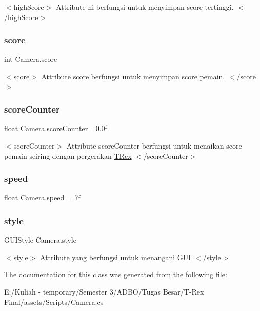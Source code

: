$<$high\+Score$>$ Attribute hi berfungsi untuk menyimpan score tertinggi. $<$/high\+Score$>$ \hypertarget{class_camera_abf86e03ac82c531858df39468f8e190b}{}\label{class_camera_abf86e03ac82c531858df39468f8e190b} 
\subsubsection{\texorpdfstring{score}{score}}
{\footnotesize\ttfamily int Camera.\+score}

$<$score$>$ Attribute score berfungsi untuk menyimpan score pemain. $<$/score$>$ \hypertarget{class_camera_a8b771a0c2cb6e4fd4b3213a87e0f1a88}{}\label{class_camera_a8b771a0c2cb6e4fd4b3213a87e0f1a88} 
\subsubsection{\texorpdfstring{score\+Counter}{scoreCounter}}
{\footnotesize\ttfamily float Camera.\+score\+Counter =0.\+0f}

$<$score\+Counter$>$ Attribute score\+Counter berfungsi untuk menaikan score pemain seiring dengan pergerakan \hyperlink{class_t_rex}{T\+Rex} $<$/score\+Counter$>$ \hypertarget{class_camera_a9afbcb25512024bd94c4abc84c85d651}{}\label{class_camera_a9afbcb25512024bd94c4abc84c85d651} 
\subsubsection{\texorpdfstring{speed}{speed}}
{\footnotesize\ttfamily float Camera.\+speed = 7f}





\hypertarget{class_camera_afaadb7e35bf0918a0abcb53e73a2c565}{}\label{class_camera_afaadb7e35bf0918a0abcb53e73a2c565} 
\subsubsection{\texorpdfstring{style}{style}}
{\footnotesize\ttfamily G\+U\+I\+Style Camera.\+style}

$<$style$>$ Attribute yang berfungsi untuk menangani G\+UI $<$/style$>$ 

The documentation for this class was generated from the following file\+:\begin{DoxyCompactItemize}
\item 
E\+:/\+Kuliah -\/ temporary/\+Semester 3/\+A\+D\+B\+O/\+Tugas Besar/\+T-\/\+Rex Final/assets/\+Scripts/Camera.\+cs\end{DoxyCompactItemize}
